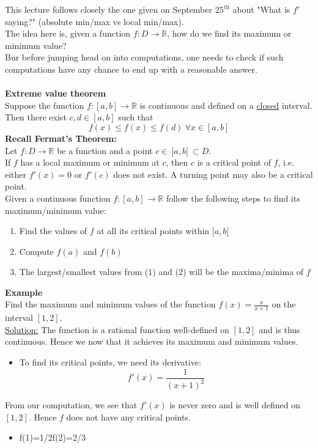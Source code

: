 \documentclass[]{article}
\begin{document}
	\normalsize
	This lecture follows closely the one given on September $25^{\text{th}}$ about "What is $f'$ saying?" (absolute min/max vs local min/max).\\
	The idea here is, given a function $f:D\rightarrow\mathbb{R}$, how do we find its maximum or minimum value?\\
	Bur before jumping head on into computations, one needs to check if such computations have any chance to end up with a reasonable answer.\\\\
	\large{\bf Extreme value theorem}\\
	\normalsize
	Suppose the function $f:[a,b]\rightarrow\mathbb{R}$ is continuous and defined on a \underline{closed} interval. Then there exist $c,d\in[a,b]$ such that
	$$
		f(x)\le f(x)\le f(d)~\forall x\in[a,b]
	$$
	{\bf Recall Fermat's Theorem:}\\
	Let $f:D\rightarrow\mathbb{R}$ be a function and a point $c\in~]a,b[~\subset D$.\\
	If $f$ has a local maximum or minimum at $c$, then $c$ is a critical point of $f$, i.e. either $f'(x)=0$ or $f'(c)$ does not exist. A turning point may also be a critical point.\\
	Given a continuous function $f:[a,b]\rightarrow\mathbb{R}$ follow the following steps to find its maximum/minimum value:
	\begin{enumerate}
		\item Find the values of $f$ at all its critical points within $]a,b[$
		\item Compute $f(a)$ and $f(b)$
		\item The largest/smallest values from (1) and (2) will be the maxima/minima of $f$
	\end{enumerate}
	{\bf Example}\\
	Find the maximum and minimum values of the function $f(x)=\frac{x}{x+1}$ on the interval $[1,2]$.\\
	\underline{Solution:} The function is a rational function well-defined on $[1,2]$ and is thus continuous. Hence we now that it achieves its maximum and minimum values.
	\begin{itemize}
		\item To find its critical points, we need its derivative:
		$$
			f'(x)=\frac{1}{(x+1)^2}
		$$
	\end{itemize}
	From our computation, we see that $f'(x)$ is never zero and is well defined on $[1,2]$. Hence $f$ does not have any critical points.
	\begin{itemize}
		\item f(1)=1/2f(2)=2/3
	\end{itemize}
\end{document}
